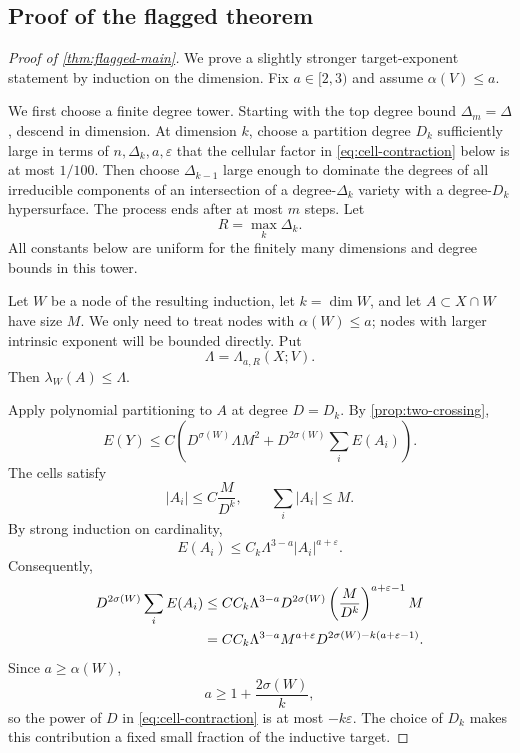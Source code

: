 \documentclass[11pt]{amsart}
\numberwithin{equation}{section}
\theoremstyle{definition}
\theoremstyle{remark}
\newcommand{\eps}{\varepsilon}
\newcommand{\1}{\mathbf 1}
\newcommand{\card}[1]{\lvert #1\rvert}
\begin{document}
\subsection{Proof of the flagged theorem}
\begin{proof}[Proof of \cref{thm:flagged-main}]
We prove a slightly stronger target-exponent statement by induction on the dimension.  Fix $a\in[2,3)$ and assume $\alpha(V)\leq a$.

We first choose a finite degree tower.  Starting with the top degree bound $\Delta_m=\Delta$, descend in dimension.  At dimension $k$, choose a partition degree $D_k$ sufficiently large in terms of $n,\Delta_k,a,\eps$ that the cellular factor in \eqref{eq:cell-contraction} below is at most $1/100$.  Then choose $\Delta_{k-1}$ large enough to dominate the degrees of all irreducible components of an intersection of a degree-$\Delta_k$ variety with a degree-$D_k$ hypersurface.  The process ends after at most $m$ steps.  Let
\[
 R=\max_k\Delta_k.
\]
All constants below are uniform for the finitely many dimensions and degree bounds in this tower.

Let $W$ be a node of the resulting induction, let $k=\dim W$, and let $A\subset X\cap W$ have size $M$.  We only need to treat nodes with $\alpha(W)\leq a$; nodes with larger intrinsic exponent will be bounded directly.  Put
\[
 \Lambda=\Lambda_{a,R}(X;V).
\]
Then $\lambda_W(A)\leq\Lambda$.

Apply polynomial partitioning to $A$ at degree $D=D_k$.  By \cref{prop:two-crossing},
\begin{equation}\label{eq:node-cell}
 E(Y)
 \leq C\left(D^{\sigma(W)}\Lambda M^2
 +D^{2\sigma(W)}\sum_iE(A_i)\right).
\end{equation}
The cells satisfy
\begin{equation}\label{eq:cell-size}
 \card{A_i}\leq C\frac{M}{D^k},
 \qquad
 \sum_i\card{A_i}\leq M.
\end{equation}
By strong induction on cardinality,
\[
 E(A_i)\leq C_k\Lambda^{3-a}\card{A_i}^{a+\eps}.
\]
Consequently,
\begin{align}
 D^{2\sigma(W)}\sum_iE(A_i)
 &\leq C C_k\Lambda^{3-a}D^{2\sigma(W)}
 \left(\frac{M}{D^k}\right)^{a+\eps-1}M\notag\\
 &=C C_k\Lambda^{3-a}M^{a+\eps}
 D^{2\sigma(W)-k(a+\eps-1)}.\label{eq:cell-contraction}
\end{align}
Since $a\geq\alpha(W)$,
\[
 a\geq1+\frac{2\sigma(W)}k,
\]
so the power of $D$ in \eqref{eq:cell-contraction} is at most $-k\eps$.  The choice of $D_k$ makes this contribution a fixed small fraction of the inductive target.


\end{proof}
\end{document}
